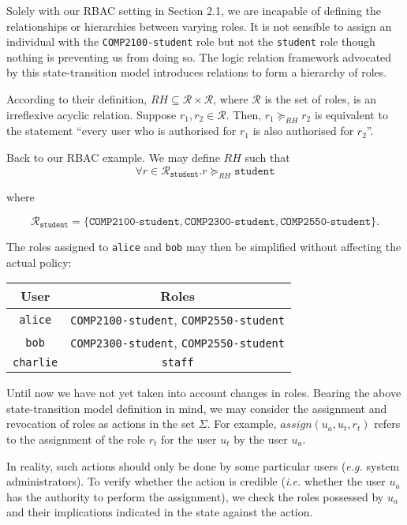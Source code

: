 \documentclass{article}
\begin{document}
Solely with our RBAC setting in Section 2.1, we are incapable of defining
the relationships or hierarchies between varying roles. It is not sensible
to assign an individual with the \texttt{COMP2100-student} role but not the
\texttt{student} role though nothing is preventing us from doing so. The
logic relation framework advocated by this state-transition model introduces
relations to form a hierarchy of roles.

According to their definition, $RH \subseteq \mathcal{R} \times
\mathcal{R}$, where $\mathcal{R}$ is the set of roles, is an irreflexive
acyclic relation.\cite{formal-verification} Suppose $r_{1}, r_{2} \in
\mathcal{R}$. Then, $r_{1} \succeq_{RH} r_{2}$ is equivalent to the statement
``every user who is authorised for $r_{1}$ is also authorised for $r_{2}$''.

Back to our RBAC example. We may define $RH$ such that $$\forall r
\in \mathcal{R}_{\texttt{student}} . r \succeq_{RH} \texttt{student}$$
\begin{center}
    where
\end{center} $$\mathcal{R}_{\texttt{student}} = \{ \texttt{COMP2100-student},
\texttt{COMP2300-student}, \texttt{COMP2550-student} \}.$$

The roles assigned to \texttt{alice} and \texttt{bob} may then be simplified
without affecting the actual policy: \begin{center} \begin{tabular}{c|c}
    User & Roles\\ \hline \texttt{alice} & \texttt{COMP2100-student},
    \texttt{COMP2550-student}\\ \texttt{bob} & \texttt{COMP2300-student},
    \texttt{COMP2550-student}\\ \texttt{charlie} & \texttt{staff}
\end{tabular} \end{center}

Until now we have not yet taken into account changes in roles. Bearing
the above state-transition model definition in mind, we may consider the
assignment and revocation of roles as actions in the set $\Sigma$. For example,
$\textit{assign}(u_{a}, u_{t}, r_{t})$ refers to the assignment of the role
$r_{t}$ for the user $u_{t}$ by the user $u_{a}$.

In reality, such actions should only be done by some particular users
(\textit{e.g.} system administrators). To verify whether the action is credible
(\textit{i.e.} whether the user $u_{a}$ has the authority to perform the
assignment), we check the roles possessed by $u_{a}$ and their implications
indicated in the state against the action.
\end{document}
